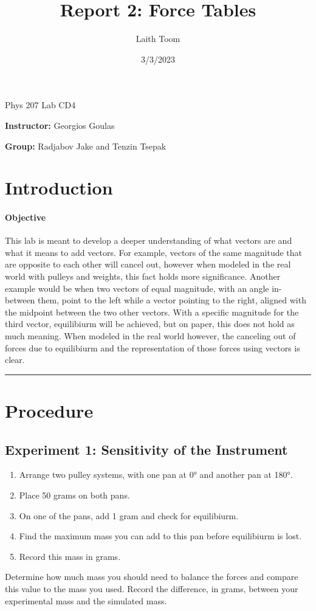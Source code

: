 \documentclass{article}
\title{Report 2: Force Tables}
\date{3/3/2023}
\author{Laith Toom}
\begin{document}
\maketitle
\noindent Phys 207 Lab CD4

\noindent \textbf{Instructor:} Georgios Goulas

\noindent \textbf{Group:} Radjabov Jake and Tenzin Tsepak

\newpage 

\tableofcontents

\newpage

\section{Introduction}
\paragraph{Objective} This lab is meant to develop a deeper understanding of what 
vectors are and what it means to add vectors. For example, vectors of the same 
magnitude that are opposite to each other will cancel out, however when modeled 
in the real world with pulleys and weights, this fact holds more significance. Another
example would be when two vectors of equal magnitude, with an angle in-between them, 
point to the left while a vector pointing to the right, aligned with the midpoint 
between the two other vectors. With a specific magnitude for the third vector, 
equilibiurm will be achieved, but on paper, this does not hold as much meaning. When 
modeled in the real world however, the canceling out of forces due to equilibiurm 
and the representation of those forces using vectors is clear.  

\bigskip
\hrule 

\section{Procedure}
\subsection{Experiment 1: Sensitivity of the Instrument}
\begin{enumerate}
    \item Arrange two pulley systems, with one pan at \ang{0} and another pan 
    at \ang{180}.
    \item Place 50 grams on both pans.
    \item On one of the pans, add 1 gram and check for equilibiurm. 
    \item Find the maximum mass you can add to this pan before equilibiurm
    is lost.
    \item Record this mass in grams.
\end{enumerate}
Determine how much mass you should need to balance the forces and compare this value 
to the mass you used. Record the difference, in grams, between your experimental mass and 
the simulated mass.
\end{document}
